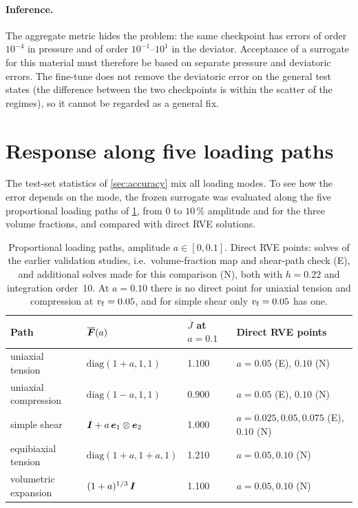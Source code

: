 \paragraph{Inference.} The aggregate metric hides the problem: the same checkpoint has errors of order $10^{-4}$ in
pressure and of order $10^{-1}$--$10^{1}$ in the deviator. Acceptance of a surrogate for this
material must therefore be based on separate pressure and deviatoric errors. The fine-tune
does not remove the deviatoric error on the general test states (the difference between the two
checkpoints is within the scatter of the regimes), so it cannot be regarded as a general fix.

\section{Response along five loading paths}\label{sec:paths}

The test-set statistics of \cref{sec:accuracy} mix all loading modes. To see how
the error depends on the mode, the frozen surrogate was evaluated along the five
proportional loading paths of \cref{tab:paths}, from $0$ to $10\,\%$ amplitude and
for the three volume fractions, and compared with direct RVE solutions.

\begin{table}[htbp]
\centering\small
\caption[Proportional loading paths]{Proportional loading paths, amplitude $a\in[0,0.1]$. Direct RVE points:
solves of the earlier validation studies, i.e.\ volume-fraction map and shear-path check (E), and additional solves made for this comparison (N), both with
$h=0.22$ and integration order~10. At $a=0.10$ there is no direct point for uniaxial tension and compression at
$v_{\mathrm f}=0.05$, and for simple shear only $v_{\mathrm f}=0.05$ has one.}
\label{tab:paths}
\begin{tabular}{@{}llll@{}}
\toprule
Path & $\overline{\bm F}(a)$ & $\overline J$ at $a=0.1$ & Direct RVE points\\
\midrule
uniaxial tension & $\mathrm{diag}(1+a,1,1)$ & 1.100 & $a=0.05$ (E), $0.10$ (N)\\
uniaxial compression & $\mathrm{diag}(1-a,1,1)$ & 0.900 & $a=0.05$ (E), $0.10$ (N)\\
simple shear & $\bm I+a\,\bm e_1\otimes\bm e_2$ & 1.000 & $a=0.025,0.05,0.075$ (E), $0.10$ (N)\\
equibiaxial tension & $\mathrm{diag}(1+a,1+a,1)$ & 1.210 & $a=0.05,0.10$ (N)\\
volumetric expansion & $(1+a)^{1/3}\,\bm I$ & 1.100 & $a=0.05,0.10$ (N)\\
\bottomrule
\end{tabular}
\end{table}

